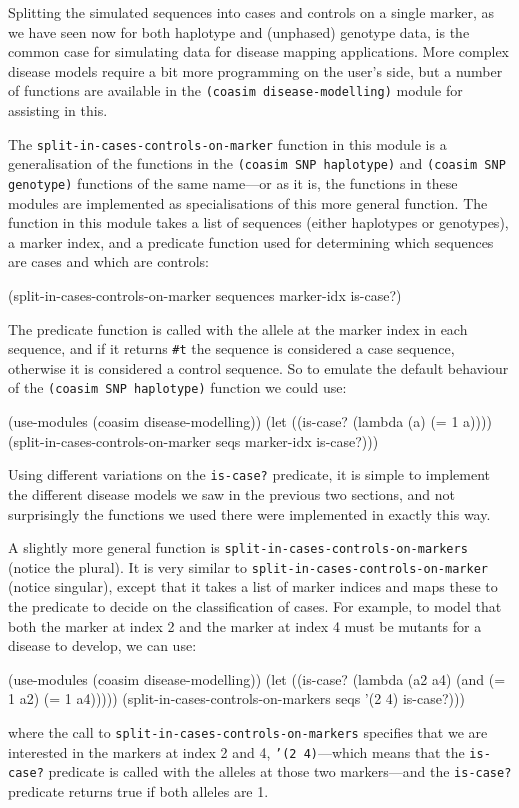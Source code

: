 \documentclass{manual}
\begin{document}
\begin{empfile}
Splitting the simulated sequences into cases and controls on a single
marker, as we have seen now for both haplotype and (unphased) genotype
data, is the common case for simulating data for disease mapping
applications.  More complex disease models require a bit more
programming on the user's side, but a number of functions are
available in the \texttt{(coasim disease-modelling)} module for
assisting in this.

The \texttt{split-in-cases-controls-on-marker} function in this module
is a generalisation of the functions in the \texttt{(coasim SNP
  haplotype)} and \texttt{(coasim SNP genotype)} functions of the same
name---or as it is, the functions in these modules are implemented as
specialisations of this more general function.  The function in this
module takes a list of sequences (either haplotypes or genotypes), a
marker index, and a predicate function used for determining which
sequences are cases and which are controls:
\begin{code}
(split-in-cases-controls-on-marker sequences marker-idx is-case?)
\end{code}

The predicate function is called with the allele at the marker index
in each sequence, and if it returns \texttt{\#t} the sequence is
considered a case sequence, otherwise it is considered a control
sequence.  So to emulate the default behaviour of the \texttt{(coasim
  SNP haplotype)} function we could use:
\begin{code}
(use-modules (coasim disease-modelling))
(let ((is-case? (lambda (a) (= 1 a))))
   (split-in-cases-controls-on-marker seqs marker-idx is-case?))) 
\end{code}

Using different variations on the \texttt{is-case?} predicate, it is
simple to implement the different disease models we saw in the
previous two sections, and not surprisingly the functions we used
there were implemented in exactly this way.

A slightly more general function is
\texttt{split-in-cases-controls-on-markers} (notice the plural).  It
is very similar to \texttt{split-in-cases-controls-on-marker} (notice
singular), except that it takes a list of marker indices and maps
these to the predicate to decide on the classification of cases.  For
example, to model that both the marker at index 2 and the marker at
index 4 must be mutants for a disease to develop, we can use:
\begin{code}
(use-modules (coasim disease-modelling))
(let ((is-case? (lambda (a2 a4) (and (= 1 a2) (= 1 a4)))))
   (split-in-cases-controls-on-markers seqs '(2 4) is-case?)))
\end{code}
where the call to \texttt{split-in-cases-controls-on-markers}
specifies that we are interested in the markers at index 2 and 4,
\texttt{'(2 4)}---which means that the \texttt{is-case?} predicate is
called with the alleles at those two markers---and the
\texttt{is-case?} predicate returns true if both alleles are 1.


\end{empfile}
\end{document}
